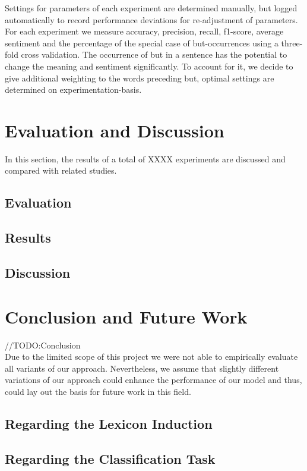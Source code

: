 \documentclass[11pt,titlepage,oneside,openany]{book}
\begin{document}
Settings for parameters of each experiment are determined manually, but logged automatically to record performance deviations for re-adjustment of parameters. For each experiment we measure accuracy, precision, recall, f1-score, average sentiment and the percentage of the special case of but-occurrences using a three-fold cross validation. The occurrence of but in a sentence has the potential to change the meaning and sentiment significantly. To account for it, we decide to give additional weighting to the words preceding but, optimal settings are determined on experimentation-basis.






\chapter{Evaluation and Discussion}

In this section, the results of a total of XXXX experiments are discussed and compared with related studies.
 

\section{Evaluation}


\section{Results}

\section{Discussion}


\chapter{Conclusion and Future Work}
//TODO:Conclusion\\
Due to the limited scope of this project we were not able to empirically evaluate all variants of our approach. Nevertheless, we assume that slightly different variations of our approach could enhance the performance of our model and thus, could lay out the basis for future work in this field.

\section{Regarding the Lexicon Induction}

\section{Regarding the Classification Task}




\end{document}
